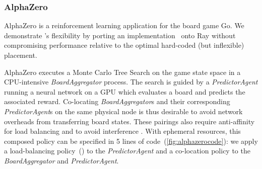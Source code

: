 


\subsubsection{AlphaZero}
AlphaZero \cite{silver2017mastering} is a reinforcement learning application for the board game Go.
We demonstrate \name{}'s flexibility by porting an implementation~\cite{anthony2017thinking} onto Ray without compromising performance relative to the optimal hard-coded (but inflexible) placement.

AlphaZero executes a Monte Carlo Tree Search on the game state space in a CPU-intensive \textit{BoardAggregator} process. The search is guided by a \textit{PredictorAgent} running a neural network on a GPU which evaluates a board and predicts the associated reward.
Co-locating \textit{BoardAggregator}s and their corresponding \textit{PredictorAgent}s on the same physical node is thus desirable to avoid network overheads from transferring board states. These pairings also require anti-affinity for load balancing and to avoid interference \cite{gandiva}.
With ephemeral resources, this composed policy can be specified in 5 lines of code~(\cref{fig:alphazerocode}): we apply a load-balancing policy~() to the \textit{PredictorAgent} and a co-location policy to the \textit{BoardAggregator} and \textit{PredictorAgent}.

